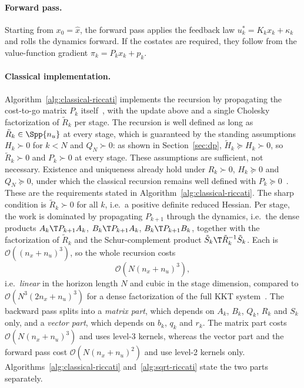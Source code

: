 \paragraph{Forward pass.}
Starting from $x_0 = \hat{x}$, the forward pass applies the feedback law $u_k^* = K_k x_k + \kappa_k$
and rolls the dynamics forward. If the costates are required, they follow from the
value-function gradient $\pi_k = P_k x_k + p_k$.

\paragraph{Classical implementation.}
Algorithm~\ref{alg:classical-riccati} implements the recursion by propagating the
cost-to-go matrix $P_k$ itself~\cite{frison2013efficient}, with the update above and
a single Cholesky factorization of $\tilde{R}_k$ per stage.
The recursion is well defined as long as $\tilde{R}_k \in \Spp{n_u}$ at every
stage, which is guaranteed by the standing assumptions
$H_k \succ 0$ for $k < N$ and $Q_N \succ 0$: as shown in Section~\ref{sec:dp},
$\tilde{H}_k \succeq H_k \succ 0$, so $\tilde{R}_k \succ 0$ and $P_k \succ 0$ at
every stage.
These assumptions are sufficient, not necessary. Existence and uniqueness already
hold under $R_k\succ0$, $H_k\succeq0$ and $Q_N\succeq0$, under which the classical
recursion remains well defined with $P_k\succeq0$~\cite{frison2015algorithms}. These are the requirements
stated in Algorithm~\ref{alg:classical-riccati}.
The sharp condition is $\tilde{R}_k \succ 0$ for all $k$, i.e.\ a positive definite
reduced Hessian.
Per stage, the work is dominated by propagating $P_{k+1}$ through the dynamics,
i.e.\ the dense products $A_k\T P_{k+1} A_k$, $B_k\T P_{k+1} A_k$, $B_k\T P_{k+1} B_k$,
together with the factorization of $\tilde{R}_k$ and the Schur-complement
product $\tilde{S}_k\T \tilde{R}_k^{-1} \tilde{S}_k$. Each is
$\mathcal{O}\!\left((n_x + n_u)^3\right)$, so the whole recursion costs
\[
\mathcal{O}\!\left(N (n_x + n_u)^3\right),
\]
i.e.\ \textit{linear} in the horizon length $N$ and cubic in the stage
dimension, compared to $\mathcal{O}\!\left(N^3 (2n_x + n_u)^3\right)$ for a dense
factorization of the full KKT system~\cite{frison2013efficient}.
The backward pass splits into a \textit{matrix part}, which depends on
$A_k$, $B_k$, $Q_k$, $R_k$ and $S_k$ only, and a \textit{vector part}, which depends
on $b_k$, $q_k$ and $r_k$. The matrix part costs
$\mathcal{O}\!\left(N (n_x + n_u)^3\right)$ and uses level-3 kernels, whereas the
vector part and the forward pass cost $\mathcal{O}\!\left(N (n_x + n_u)^2\right)$
and use level-2 kernels only. Algorithms~\ref{alg:classical-riccati}
and~\ref{alg:sqrt-riccati} state the two parts separately.


